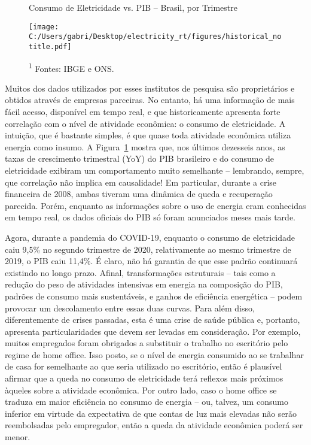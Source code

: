 \documentclass[12pt]{article}
\begin{document}
\begin{figure}[!bp]
	\centering
	\caption{Consumo de Eletricidade vs. PIB -- Brasil, por Trimestre}
	\label{fig:figure1}
	\texttt{[image: C:/Users/gabri/Desktop/electricity\_rt/figures/historical\_notitle.pdf]}	
	\caption*{\textsuperscript{1} Fontes: IBGE e ONS.}
\end{figure}
	
Muitos dos dados utilizados por esses institutos de pesquisa são proprietários e obtidos através de empresas parceiras. No entanto, há uma informação de mais fácil acesso, disponível em tempo real, e que historicamente apresenta forte correlação com o nível de atividade econômica: o consumo de eletricidade. A intuição, que é bastante simples, é que quase toda atividade econômica utiliza energia como insumo. A Figura~{\ref{fig:figure1}} mostra que, nos últimos dezesseis anos, as taxas de crescimento trimestral (YoY) do PIB brasileiro e do consumo de eletricidade exibiram um comportamento muito semelhante -- lembrando, sempre, que correlação não implica em causalidade! Em particular, durante a crise financeira de 2008, ambas tiveram uma dinâmica de queda e recuperação parecida. Porém, enquanto as informações sobre o uso de energia eram conhecidas em tempo real, os dados oficiais do PIB só foram anunciados meses mais tarde. 

Agora, durante a pandemia do COVID-19, enquanto o consumo de eletricidade caiu 9,5\% no segundo trimestre de 2020, relativamente ao mesmo trimestre de 2019, o PIB caiu 11,4\%. É claro, não há garantia de que esse padrão continuará existindo no longo prazo. Afinal, transformações estruturais -- tais como a redução do peso de atividades intensivas em energia na composição do PIB, padrões de consumo mais sustentáveis, e ganhos de eficiência energética -- podem provocar um descolamento entre essas duas curvas. Para além disso, diferentemente de crises passadas, esta é uma crise de saúde pública e, portanto, apresenta particularidades que devem ser levadas em consideração. Por exemplo, muitos empregados foram obrigados a substituir o trabalho no escritório pelo regime de home office. Isso posto, se o nível de energia consumido ao se trabalhar de casa for semelhante ao que seria utilizado no escritório, então é plausível afirmar que a queda no consumo de eletricidade terá reflexos mais próximos àqueles sobre a atividade econômica. Por outro lado, caso o home office se traduza em maior eficiência no consumo de energia -- ou, talvez, um consumo inferior em virtude da expectativa de que contas de luz mais elevadas não serão reembolsadas pelo empregador, então a queda da atividade econômica poderá ser menor.
\end{document}
